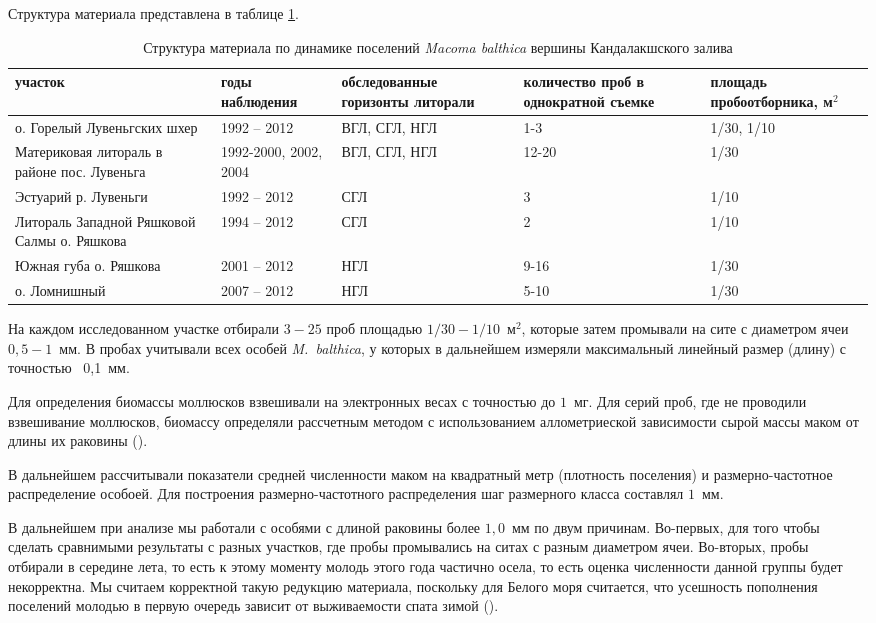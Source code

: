 Структура материала представлена в таблице \ref{tab:material_Kandalaksha}.
\begin{table}[p]
\caption{Структура материала по динамике поселений {\it Macoma balthica} вершины Кандалакшского залива}
\label{tab:material_Kandalaksha}
    \begin{tabularx}{\textwidth}{|*{5}{X|}} \hline
участок & годы наблюдения & обследованные горизонты литорали & количество проб в однократной съемке & площадь пробоотборника, м$^2$  \\ \hline
о. Горелый Лувеньгских шхер & 1992 -- 2012 & ВГЛ, СГЛ, НГЛ & 1-3 & 1/30, 1/10 \\ \hline
Материковая литораль в районе пос. Лувеньга & 1992-2000, 2002, 2004 & ВГЛ, СГЛ, НГЛ & 12-20 & 1/30 \\ \hline
Эстуарий р. Лувеньги & 1992 -- 2012 & СГЛ & 3 & 1/10 \\ \hline
Литораль Западной Ряшковой Салмы о. Ряшкова & 1994 -- 2012 & СГЛ & 2 & 1/10 \\ \hline
Южная губа о. Ряшкова & 2001 -- 2012 & НГЛ & 9-16 & 1/30 \\ \hline
о. Ломнишный & 2007 -- 2012 & НГЛ & 5-10 & 1/30  \\ \hline
\end{tabularx}
\end{table}

На каждом исследованном участке отбирали $3 - 25$ проб площадью $1/30 - 1/10$~м$^2$, которые затем промывали на сите с диаметром ячеи $0,5 - 1$~мм. 
В пробах учитывали всех особей {\it M.~balthica}, у которых в дальнейшем измеряли максимальный линейный размер (длину) с точностью ~0,1~мм. 

Для определения биомассы моллюсков взвешивали на электронных весах с точностью до $1$~мг. 
Для серий проб, где не проводили взвешивание моллюсков, биомассу определяли рассчетным методом с использованием аллометриеской зависимости сырой массы маком от длины их раковины (\cite{Maximovich_et_al_1993}). 

В дальнейшем рассчитывали показатели средней численности маком на квадратный метр (плотность поселения) и размерно-частотное распределение особоей.
Для построения размерно-частотного распределения шаг размерного класса составлял $1$~мм.

В дальнейшем при анализе мы работали с особями с длиной раковины более $1,0$~мм по двум причинам. 
Во-первых, для того чтобы сделать сравнимыми результаты с разных участков, где пробы промывались на ситах с разным диаметром ячеи. 
Во-вторых, пробы отбирали в середине лета, то есть к этому моменту молодь этого года частично осела, то есть оценка численности данной группы будет некорректна.
Мы считаем корректной такую редукцию материала, поскольку для Белого моря считается, что усешность пополнения поселений молодью в первую очередь зависит от выживаемости спата зимой (\cite{Maximovich_Gerasimova_2004}).

